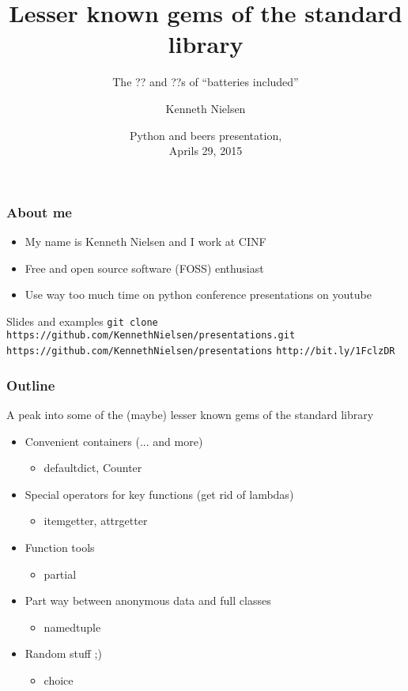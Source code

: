 \documentclass{beamer}
\title{Lesser known gems of the standard library}
\subtitle{The ?? and ??s of ``batteries included''}
\author{Kenneth Nielsen\inst{1}}
\institute
{
  \inst{1}%
  Center for Individual Nanoparticle Functionality (CINF)\\
  Institute of Physics\\
  Technical University of Denmark (DTU)
}
\date{
  Python and beers presentation,\\
  Aprils 29, 2015}
\begin{document}
\frame{\titlepage}

\begin{frame}
  \frametitle{About me}
  \begin{itemize}
    \item My name is Kenneth Nielsen and I work at CINF
    \item Free and open source software (FOSS) enthusiast
    \item Use way too much time on python conference presentations on
      youtube
  \end{itemize}
  \begin{block}{Slides and examples}
    \center
    \footnotesize
    \texttt{git clone https://github.com/KennethNielsen/presentations.git}\newline
    \newline
    \texttt{https://github.com/KennethNielsen/presentations}
    \texttt{http://bit.ly/1FclzDR}
  \end{block}
\end{frame}

\begin{frame}
  \frametitle{Outline}

  A peak into some of the (maybe) lesser known gems of the standard library
  \begin{itemize}
  \item Convenient containers (... and more)
    \begin{itemize}
    \item defaultdict, Counter
    \end{itemize}
  \item Special operators for key functions (get rid of lambdas)
    \begin{itemize}
    \item itemgetter, attrgetter
    \end{itemize}
  \item Function tools
    \begin{itemize}
    \item partial
    \end{itemize}
  \item Part way between anonymous data and full classes
    \begin{itemize}
    \item namedtuple
    \end{itemize}
  \item Random stuff ;)
    \begin{itemize}
    \item choice
    \end{itemize}
  \end{itemize}
\end{frame}
\end{document}
